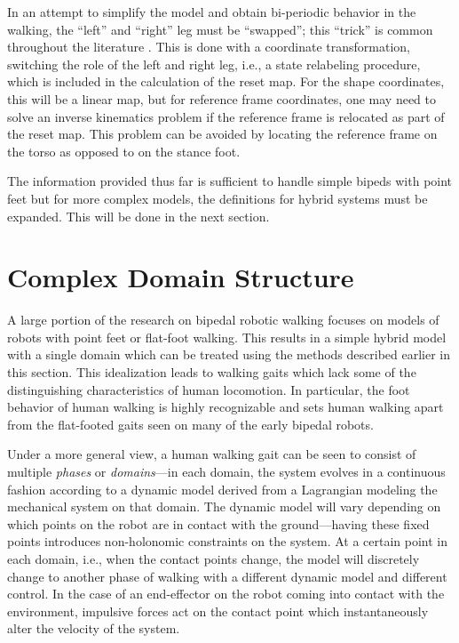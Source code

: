 In an attempt to simplify the model and obtain bi-periodic behavior in the
walking, the ``left'' and ``right'' leg must be ``swapped'';
%
this ``trick'' is common throughout the literature \cite{Grizzle2001}.
%
This is done with a coordinate transformation, switching the role of the left
and right leg, i.e., a state relabeling procedure, which is included in the
calculation of the reset map.
%
For the shape coordinates, this will be a linear map, but for reference frame
coordinates, one may need to solve an inverse kinematics problem if the
reference frame is relocated as part of the reset map.
%
This problem can be avoided by locating the reference frame on the torso as
opposed to on the stance foot.

The information provided thus far is sufficient to handle simple bipeds with
point feet but for more complex models, the definitions for hybrid systems must
be expanded.
%
This will be done in the next section.


\section{Complex Domain Structure} \label{sec:complex-models}

%
A large portion of the research on bipedal robotic walking focuses on models of
robots with point feet or flat-foot walking.
%
This results in a simple hybrid model with a single domain which can be treated
using the methods described earlier in this section.
%
This idealization leads to walking gaits which lack some of the distinguishing
characteristics of human locomotion.
%
In particular, the foot behavior of human walking is highly recognizable and
sets human walking apart from the flat-footed gaits seen on many of the early
bipedal robots.

Under a more general view, a human walking gait can be seen to consist of
multiple {\em phases} or {\em domains}---in each domain, the system evolves in a
continuous fashion according to a dynamic model derived from a Lagrangian
modeling the mechanical system on that domain.
%
The dynamic model will vary depending on which points on the robot are in
contact with the ground---having these fixed points introduces non-holonomic
constraints on the system.
%
At a certain point in each domain, i.e., when the contact points change, the
model will discretely change to another phase of walking with a different
dynamic model and different control.
%
In the case of an end-effector on the robot coming into contact with the
environment, impulsive forces act on the contact point which instantaneously
alter the velocity of the system.
%

